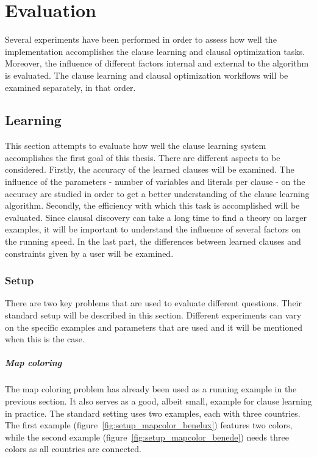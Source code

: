 \chapter{Evaluation}
\label{cha:evaluation}

Several experiments have been performed in order to assess how well the implementation accomplishes the clause learning and clausal optimization tasks.
Moreover, the influence of different factors internal and external to the algorithm is evaluated.
The clause learning and clausal optimization workflows will be examined separately, in that order.

\section{Learning}

This section attempts to evaluate how well the clause learning system accomplishes the first goal of this thesis.
There are different aspects to be considered.
Firstly, the accuracy of the learned clauses will be examined.
The influence of the parameters - number of variables and literals per clause - on the accuracy are studied in order to get a better understanding of the clause learning algorithm.
Secondly, the efficiency with which this task is accomplished will be evaluated.
Since clausal discovery can take a long time to find a theory on larger examples, it will be important to understand the influence of several factors on the running speed.
In the last part, the differences between learned clauses and constraints given by a user will be examined.

\subsection{Setup}
There are two key problems that are used to evaluate different questions.
Their standard setup will be described in this section.
Different experiments can vary on the specific examples and parameters that are used and it will be mentioned when this is the case.

\paragraph{Map coloring}
The map coloring problem has already been used as a running example in the previous section.
It also serves as a good, albeit small, example for clause learning in practice.
The standard setting uses two examples, each with three countries.
The first example (figure~\ref{fig:setup_mapcolor_benelux}) features two colors, while the second example (figure~\ref{fig:setup_mapcolor_benede}) needs three colors as all countries are connected.

